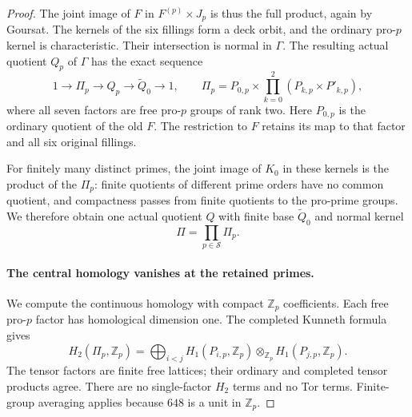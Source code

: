\begin{proof}
The joint image of $F$ in $F^{(p)}\times J_p$ is thus
the full product, again by Goursat. The kernels of
the six fillings form a deck orbit, and the ordinary
pro-$p$ kernel is characteristic. Their intersection
is normal in $\Gamma$. The resulting actual quotient
$Q_p$ of $\Gamma$ has the exact sequence
\[
 1\longrightarrow\Pi_p\longrightarrow Q_p
        \longrightarrow\widetilde Q_0\longrightarrow1,
 \qquad
 \Pi_p=P_{0,p}\times
       \prod_{k=0}^2(P_{k,p}\times P'_{k,p}),            \tag{C.40.13}
\]
where all seven factors are free pro-$p$ groups of
rank two. Here $P_{0,p}$ is the ordinary quotient of
the old $F$. The restriction to $F$ retains its map
to that factor and all six original fillings.

For finitely many distinct primes, the joint image
of $K_0$ in these kernels is the product of the
$\Pi_p$: finite quotients of different prime orders
have no common quotient, and compactness passes from
finite quotients to the pro-prime groups. We therefore
obtain one actual quotient $Q$ with finite base
$\widetilde Q_0$ and normal kernel
\[
                         \Pi=\prod_{p\in\mathcal S}\Pi_p.
                                                        \tag{C.40.14}
\]

\paragraph{The central homology vanishes at the retained primes.}
We compute the continuous homology with compact
$\mathbb Z_p$ coefficients. Each free pro-$p$ factor
has homological dimension one. The completed Kunneth
formula gives
\[
 H_2(\Pi_p,\mathbb Z_p)=
   \bigoplus_{i<j}
       H_1(P_{i,p},\mathbb Z_p)\otimes_{\mathbb Z_p}
       H_1(P_{j,p},\mathbb Z_p).                        \tag{C.40.15}
\]
The tensor factors are finite free lattices; their
ordinary and completed tensor products agree. There
are no single-factor $H_2$ terms and no Tor terms.
Finite-group averaging applies because $648$ is a
unit in $\mathbb Z_p$.


\end{proof}
